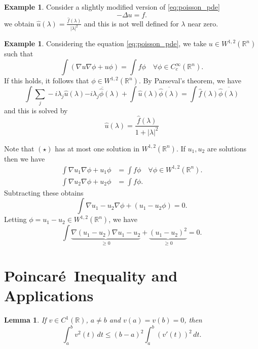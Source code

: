 \documentclass[10pt, oneside, reqno]{amsart}
\theoremstyle{plain}%
\newtheorem{lem}[thm]{Lemma}
\numberwithin{equation}{section}
\theoremstyle{definition}
\newtheorem{exmp}[thm]{Example}
\theoremstyle{remark}
\newcommand{\R}{\mathbb{R}}
\begin{document}
\begin{exmp}
    Consider a slightly modified version of \eqref{eq:poisson_pde} \[
        -\Delta u = f. 
    \] we obtain $\hat u (\lambda) = \frac{\hat f(\lambda)}{|\lambda|^2}$ and this is not well defined for $\lambda$ near zero.
\end{exmp}

\newcommand{\grad}{\nabla}
\begin{exmp}
    Considering the equation \eqref{eq:poisson_pde}, we take $u \in W^{1, 2}(\R^n)$ such that \[
        \int \left( \grad u \grad \phi + u \phi \right) = \int f \phi \quad \forall \phi \in C_c^\infty(\R^n).
        \tag{$\star$}
    \] If this holds, it follows that $\phi \in W^{1, 2}(\R^n)$.  By Parseval's theorem, we have \[
        \int \sum_{j} -i \lambda_j \hat u(\lambda) \overline{-i \lambda_j \hat \phi(\lambda)} + \int \hat u(\lambda) \overline{\hat \phi(\lambda)} = \int \hat f(\lambda) \overline{ \hat\phi(\lambda)}
    \] and this is solved by \[
        \hat u(\lambda) = \frac{\hat f(\lambda)}{1 + |\lambda|^2}
    \]
    
    Note that $(\star)$ has at most one solution in $W^{1, 2}(\R^n)$.  If $u_1, u_2$ are solutions then we have \begin{align*}
        \int \grad u_1 \grad \phi  + u_1 \phi &= \int f \phi \quad \forall \phi \in W^{1, 2}(\R^n). \\
        \int \grad u_2 \grad \phi + u_2 \phi &= \int f \phi.
    \end{align*}  Subtracting these obtains \[
        \int \grad{u_1 - u_2} \grad \phi + (u_1 - u_2 \phi) = 0.
    \]  Letting $\phi = u_1 - u_2 \in W^{1, 2}(\R^n)$, we have \[
        \int \underbrace{\grad(u_1 - u_2) \grad{u_1 - u_2}}_{\geq 0} + \underbrace{(u_1 - u_2)^2}_{\geq 0} = 0.
    \]
\end{exmp}

\newcommand{\poincare}{Poincar\'e\ }
\section{\poincare Inequality and Applications} %
\label{sec:poincar'e_inequality_and_applications}

\begin{lem}
    \label{lem:poincare_lemma}
    If $v \in C^1(\R)$, $a \neq b$ and $v(a) = v(b) = 0$, then \begin{equation}
        \int_a^b v^2(t) \, dt \leq (b-a)^2 \int_a^b \left(v'(t) \right)^2 \, dt.
    \end{equation}  
\end{lem}
\end{document}
